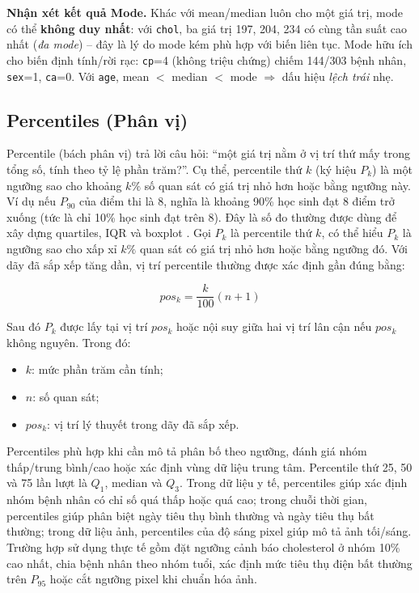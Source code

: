 \textbf{Nhận xét kết quả Mode.} Khác với mean/median luôn cho một giá trị, mode có thể \textbf{không duy nhất}: với \texttt{chol}, ba giá trị 197, 204, 234 có cùng tần suất cao nhất (\textit{đa mode}) -- đây là lý do mode kém phù hợp với biến liên tục. Mode hữu ích cho biến định tính/rời rạc: \texttt{cp}=4 (không triệu chứng) chiếm 144/303 bệnh nhân, \texttt{sex}=1, \texttt{ca}=0. Với \texttt{age}, mean $<$ median $<$ mode $\Rightarrow$ dấu hiệu \textit{lệch trái} nhẹ.

\subsection{Percentiles (Phân vị)}

Percentile (bách phân vị) trả lời câu hỏi: ``một giá trị nằm ở vị trí thứ mấy trong tổng số, tính theo tỷ lệ phần trăm?''. Cụ thể, percentile thứ $k$ (ký hiệu $P_k$) là một ngưỡng sao cho khoảng $k\%$ số quan sát có giá trị nhỏ hơn hoặc bằng ngưỡng này. Ví dụ nếu $P_{90}$ của điểm thi là 8, nghĩa là khoảng 90\% học sinh đạt 8 điểm trở xuống (tức là chỉ 10\% học sinh đạt trên 8). Đây là số đo thường được dùng để xây dựng quartiles, IQR và boxplot \cite{Sahay2021Essentials,DeMauro2021DataAnalytics}. Gọi $P_k$ là percentile thứ $k$, có thể hiểu $P_k$ là ngưỡng sao cho xấp xỉ $k\%$ quan sát có giá trị nhỏ hơn hoặc bằng ngưỡng đó. Với dãy đã sắp xếp tăng dần, vị trí percentile thường được xác định gần đúng bằng:

\begin{equation}
pos_k = \frac{k}{100}(n+1)
\end{equation}

Sau đó $P_k$ được lấy tại vị trí $pos_k$ hoặc nội suy giữa hai vị trí lân cận nếu $pos_k$ không nguyên. Trong đó:
\begin{itemize}[leftmargin=1.6em,label=\textbullet]
 \item $k$: mức phần trăm cần tính;
 \item $n$: số quan sát;
 \item $pos_k$: vị trí lý thuyết trong dãy đã sắp xếp.
\end{itemize}

Percentiles phù hợp khi cần mô tả phân bố theo ngưỡng, đánh giá nhóm thấp/trung bình/cao hoặc xác định vùng dữ liệu trung tâm. Percentile thứ 25, 50 và 75 lần lượt là $Q_1$, median và $Q_3$. Trong dữ liệu y tế, percentiles giúp xác định nhóm bệnh nhân có chỉ số quá thấp hoặc quá cao; trong chuỗi thời gian, percentiles giúp phân biệt ngày tiêu thụ bình thường và ngày tiêu thụ bất thường; trong dữ liệu ảnh, percentiles của độ sáng pixel giúp mô tả ảnh tối/sáng. Trường hợp sử dụng thực tế gồm đặt ngưỡng cảnh báo cholesterol ở nhóm 10\% cao nhất, chia bệnh nhân theo nhóm tuổi, xác định mức tiêu thụ điện bất thường trên $P_{95}$ hoặc cắt ngưỡng pixel khi chuẩn hóa ảnh.

